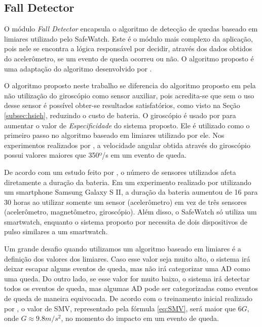 \subsection{Fall Detector}
\label{subsec:fall_detector}
O módulo \textit{Fall Detector} encapsula o algoritmo de detecção de quedas baseado em limiares utilizado pelo SafeWatch. Este é o módulo mais complexo da aplicação, pois nele se encontra a lógica responsável por decidir, através dos dados obtidos do acelerômetro, se um evento de queda ocorreu ou não. O algoritmo proposto é uma adaptação do algoritmo desenvolvido por \cite{hsieh2014wrist}. 

O algoritmo proposto neste trabalho se diferencia do algoritmo proposto em \cite{hsieh2014wrist} pela não utilização do giroscópio como sensor auxiliar, pois acredita-se que sem o uso desse sensor é possível obter-se resultados satisfatórios, como visto na Seção \ref{subsec:hsieh}, reduzindo o custo de bateria. O giroscópio é usado por \cite{hsieh2014wrist} para aumentar o valor de \textit{Especificidade} do sistema proposto. Ele é utilizado como o primeiro passo no algoritmo baseado em limiares utilizado por ele. Nos experimentos realizados por \cite{hsieh2014wrist}, a velocidade angular obtida através do giroscópio possui valores maiores que 350º/s em um evento de queda. 

De acordo com um estudo feito por \cite{casilari2015analysis}, o número de sensores utilizados afeta diretamente a duração da bateria. Em um experimento realizado por \cite{mellone2012smartphone} utilizando um smartphone Samsung Galaxy S II, a duração da bateria aumentou de 16 para 30 horas ao utilizar somente um sensor (acelerômetro) em vez de três sensores (acelerômetro, magnetômetro, giroscópio). Além disso, o SafeWatch só utiliza um smartwatch, enquanto o sistema proposto por \cite{hsieh2014wrist} necessita de dois dispositivos de pulso similares a um smartwatch. 

Um grande desafio quando utilizamos um algoritmo baseado em limiares é a definição dos valores dos limiares. Caso esse valor seja muito alto, o sistema irá deixar escapar alguns eventos de queda, mas não irá categorizar uma \ac{AD} como uma queda.  Do outro lado, se esse valor for muito baixo, o sistema irá detectar todos os eventos de queda, mas algumas \ac{AD} pode ser categorizadas como eventos de queda de maneira equivocada. De acordo com o treinamento inicial realizado por \cite{hsieh2014wrist}, o valor de \ac{SMV}, representado pela fórmula \ref{eq:SMV}, será maior que $6G$, onde $G \approx 9.8 m/s^2$,  no momento do impacto em um evento de queda. 

